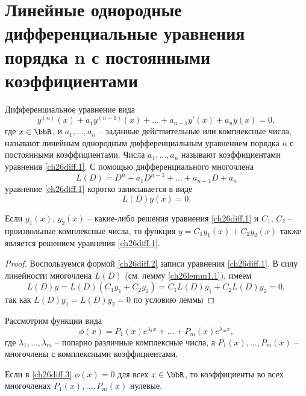 \section{Линейные однородные дифференциальные уравнения порядка n с постоянными коэффициентами}

Дифференциальное уравнение вида
\begin{equation}\label{ch26diff.1}
y^{(n)}(x)+a_1y^{(n-1)}(x)+\dots+a_{n-1}y'(x)+a_ny(x)=0,
\end{equation}
где $x\in \bbR$, и $a_1,\dots,a_n$ -- заданные действительные или комплексные числа, называют линейным однородным дифференциальным уравнением порядка $n$ с постоянными коэффициентами. Числа $a_1,\dots,a_n$ называют коэффициентами уравнения \eqref{ch26diff.1}.
С помощью дифференциального многочлена 
$$
L(D)= D^n+a_1D^{n-1}+\dots+a_{n-1}D+a_n
$$
уравнение \eqref{ch26diff.1} коротко записывается в виде
\begin{equation} \label{ch26diff.2}
L(D)y(x)=0.
\end{equation} 

\begin{lemm} \label{ch26lemm2.1}
Если $y_1(x)$, $y_2(x)$ -- какие-либо решения уравнения \eqref{ch26diff.1}  и $C_1$, $C_2$ -- произвольные комплексные числа, то функция $y=C_1y_1(x)+C_2y_2(x)$ также является решением уравнения \eqref{ch26diff.1}.
\end{lemm}

\begin{proof}
Воспользуемся формой \eqref{ch26diff.2} записи уравнения \eqref{ch26diff.1}. В силу линейности многочлена $L(D)$ (см. лемму \ref{ch26lemm1.1}), имеем
$$
L(D)y=L(D)(C_1y_1+C_2y_2)=C_1L(D)y_1+C_2L(D)y_2=0,
$$
так как $L(D)y_1=L(D)y_2=0$ по условию леммы
\end{proof}

Рассмотрим функции вида
\begin{equation} \label{ch26diff.3}
\phi(x)=P_1(x)e^{\lambda_1x}+...+P_m(x)e^{\lambda_mx},
\end{equation}
где $\lambda_1,...,\lambda_m$ -- попарно различные комплексные числа, а $P_1(x),...,P_m(x)$ -- многочлены с комплексными коэффициентами.


\begin{lemm}\label{ch26lemm2.2}
Если в \eqref{ch26diff.3} $\phi(x)=0$ для всех $x \in \bbR$, то коэффициенты во всех многочленах $P_1(x),...,P_m(x)$ нулевые.
\end{lemm}


